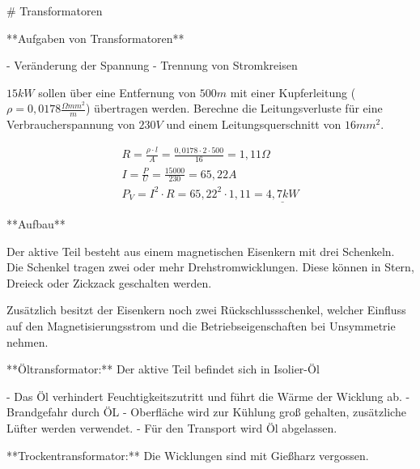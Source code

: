 \begin{markdown}

# Transformatoren


**Aufgaben von Transformatoren**

- Veränderung der Spannung
- Trennung von Stromkreisen

\end{markdown}

\vspace{1em}

$15 kW$ sollen über eine Entfernung von $500 m$ mit einer Kupferleitung ($\rho = 0,0178 \frac{\Omega mm^2}{m} $) übertragen werden. Berechne die Leitungsverluste für eine Verbraucherspannung von $230 V$ und einem Leitungsquerschnitt von $16mm^2$.

\begin{gather*}
    R = \frac{\rho \cdot l}{A} = \frac{0,0178 \cdot 2 \cdot 500}{16} = 1,11 \Omega \\
    I = \frac{P}{U} = \frac{15000}{230} = 65,22 A \\
    P_V = I^2 \cdot R = 65,22^2 \cdot 1,11 = \underline{4,7 kW}
\end{gather*}

\begin{markdown}

**Aufbau**

Der aktive Teil besteht aus einem magnetischen Eisenkern mit drei Schenkeln. Die Schenkel tragen zwei oder mehr Drehstromwicklungen. Diese können in Stern, Dreieck oder Zickzack geschalten werden.

Zusätzlich besitzt der Eisenkern noch zwei Rückschlussschenkel, welcher Einfluss auf den Magnetisierungsstrom und die Betriebseigenschaften bei Unsymmetrie nehmen.

\vspace{1em}

**Öltransformator:** \qquad Der aktive Teil befindet sich in Isolier-Öl

- Das Öl verhindert Feuchtigkeitszutritt und führt die Wärme der Wicklung ab.
- Brandgefahr durch ÖL
- Oberfläche wird zur Kühlung groß gehalten, zusätzliche Lüfter werden verwendet.
- Für den Transport wird Öl abgelassen.

\vspace{1em}

**Trockentransformator:** \quad Die Wicklungen sind mit Gießharz vergossen.
\end{markdown}